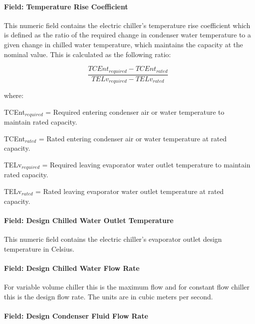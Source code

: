 \paragraph{Field: Temperature Rise Coefficient}\label{field-temperature-rise-coefficient}

This numeric field contains the electric chiller's temperature rise coefficient which is defined as the ratio of the required change in condenser water temperature to a given change in chilled water temperature, which maintains the capacity at the nominal value. This is calculated as the following ratio:

\begin{equation}
    \frac{{TCEn{t_{required}} - TCEn{t_{rated}}}}{{TEL{v_{required}} - TEL{v_{rated}}}}
\end{equation}

where:

TCEnt\(_{required}\) = Required entering condenser air or water temperature to maintain rated capacity.

TCEnt\(_{rated}\) = Rated entering condenser air or water temperature at rated capacity.

TELv\(_{required}\) = Required leaving evaporator water outlet temperature to maintain rated capacity.

TELv\(_{rated}\) = Rated leaving evaporator water outlet temperature at rated capacity.

\paragraph{Field: Design Chilled Water Outlet Temperature}\label{field-design-chilled-water-outlet-temperature}

This numeric field contains the electric chiller's evaporator outlet design temperature in Celsius.

\paragraph{Field: Design Chilled Water Flow Rate}\label{field-design-chilled-water-flow-rate-3}

For variable volume chiller this is the maximum flow and for constant flow chiller this is the design flow rate. The units are in cubic meters per second.

\paragraph{Field: Design Condenser Fluid Flow Rate}\label{field-design-condenser-fluid-flow-rate}

